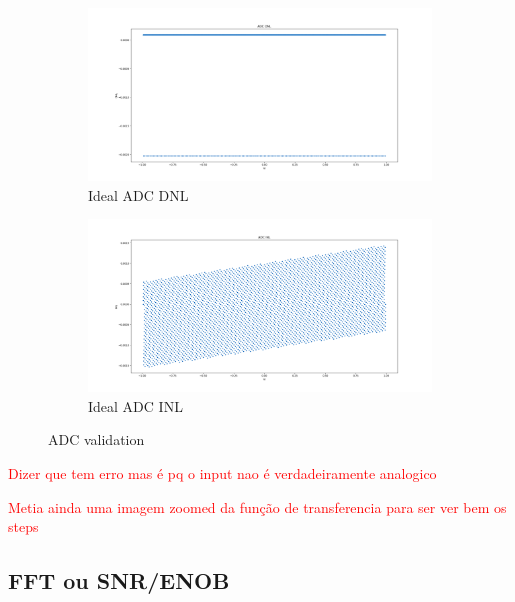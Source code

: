 \begin{figure}[H]
    \begin{subfigure}[b]{0.5\textwidth}
        \centering
        \includegraphics[width=\textwidth]{Images/DNL_Ideal.png}
        \caption{Ideal ADC DNL}
        \label{fig:ADC_DNL_Ideal}
    \end{subfigure}%
    \begin{subfigure}[b]{0.5\textwidth}
        \centering
        \includegraphics[width=\textwidth]{Images/INL_Ideal.png}
        \caption{Ideal ADC INL}
        \label{fig:ADC_INL_Ideal}
    \end{subfigure}

    \caption{ADC validation}
    \label{fig:IdealADC}
\end{figure}

\textcolor{red}{Dizer que tem erro mas é pq o input nao é verdadeiramente analogico}

\textcolor{red}{Metia ainda uma imagem zoomed da função de transferencia para ser ver bem os steps}



\subsection{FFT ou SNR/ENOB}

